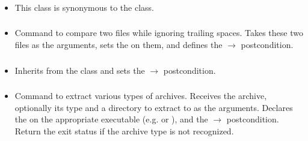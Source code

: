 \subsubsection*{}\label{subsec:RunShell}

\begin{itemize}[label={}]
    \item This class is synonymous to the \hyperref[subsec:Run]{} class.
\end{itemize}

\subsubsection*{}\label{subsec:Diff}

\begin{itemize}[label={}]
    \item Command to compare two files while ignoring trailing spaces.
          Takes these two files as the arguments, sets the
          \hyperref[subsec:FileExistsPrerequisite]{} on them, and defines the
          \hyperref[subsec:ExitCodePostcondition]{} $\rightarrow$ 
          postcondition.
\end{itemize}

\subsubsection*{}\label{subsec:RunChecker}

\begin{itemize}[label={}]
    \item Inherits from the \hyperref[subsec:Run]{} class and sets the
          \hyperref[subsec:ExitCodePostcondition]{} $\rightarrow$ 
          postcondition.
\end{itemize}

\subsubsection*{}\label{subsec:ExtractArchive}

\begin{itemize}[label={}]
    \item Command to extract various types of archives.
          Receives the archive, optionally its type and a directory to extract to as the arguments.
          Declares the \hyperref[subsec:ProgramExistsPrerequisite]{} on the
          appropriate executable (e.g.  or ), and the
          \hyperref[subsec:ExitCodePostcondition]{} $\rightarrow$ 
          postcondition.
          Return the  exit status if the archive type is not recognized.
\end{itemize}
